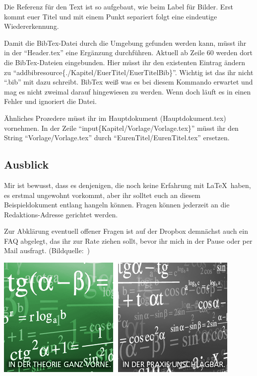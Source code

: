 \begin{multicols}{3}

Die Referenz für den Text ist so aufgebaut, wie beim Label für Bilder. Erst kommt euer Titel und mit einem Punkt separiert folgt eine eindeutige Wiedererkennung.

Damit die BibTex-Datei durch die Umgebung gefunden werden kann, müsst ihr in der \enquote{Header.tex} eine Ergänzung durchführen. Aktuell ab Zeile 60 werden dort die BibTex-Dateien eingebunden. Hier müsst ihr den existenten Eintrag ändern zu \enquote{addbibresource\{./Kapitel/EuerTitel/EuerTitelBib\}}. Wichtig ist das ihr nicht \enquote{.bib} mit dazu schreibt. BibTex weiß was es bei diesem Kommando erwartet und mag es nicht zweimal darauf hingewiesen zu werden. Wenn doch läuft es in einen Fehler und ignoriert die Datei.

Ähnliches Prozedere müsst ihr im Hauptdokument (Hauptdokument.tex) vornehmen. In der Zeile \enquote{input\{Kapitel/Vorlage/Vorlage.tex\}} müsst ihr den String \enquote{Vorlage/Vorlage.tex} durch \enquote{EurenTitel/EurenTitel.tex} ersetzen. 

\subsection*{Ausblick}
Mir ist bewusst, dass es denjenigen, die noch keine Erfahrung mit \LaTeX~haben, es erstmal ungewohnt vorkommt, aber ihr solltet euch an diesem Beispieldokument entlang hangeln können. Fragen können jederzeit an die Redaktions-Adresse gerichtet werden.

Zur Abklärung eventuell offener Fragen ist auf der Dropbox demnächst auch ein FAQ abgelegt, das ihr zur Rate ziehen sollt, bevor ihr mich in der Pause oder per Mail ausfragt. (Bildquelle:~\cite{vorlage.8})

\printbibliography[segment=1,heading=subbibliography]
\end{multicols}
\begin{Figure}
\includegraphics[width=\linewidth]{Kapitel/Vorlage/Grafiken/sg_ft_zemath.png}
\end{Figure}

\newpage
